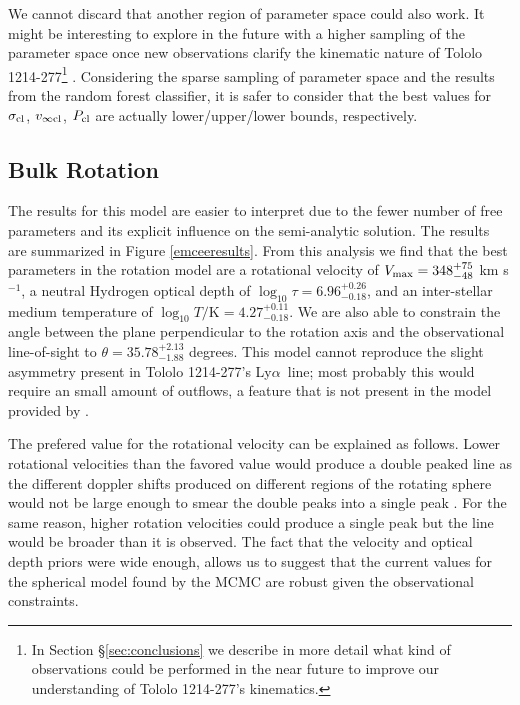 \documentclass[a4,useAMS,usenatbib,usegraphicx]{mn2e}
\newcommand{\tol}{Tololo 1214-277}
\newcommand{\lya}{Ly$\alpha$}
\newcommand{\kms}{km s$^{-1}$}
\begin{document}
We cannot discard that another region of parameter space
could also work.
It might be interesting to explore in the
future with a higher sampling of the parameter space once new 
observations  clarify the kinematic nature of \tol \footnote{In
  Section \S \ref{sec:conclusions} we describe  in more detail what
  kind of observations could be performed in the near future to
  improve our understanding of \tol's kinematics.} . 
Considering the sparse sampling of parameter space and the results
from the random forest classifier, it is safer to consider that
the best values for $\sigma_{\rm cl}$, $v_{\infty {\rm cl}}$, $P_{\rm
  cl}$ are actually lower/upper/lower bounds, respectively. 


\subsection{Bulk Rotation}

The results for this model are easier to interpret due to the fewer
number of free parameters and its explicit influence on the
semi-analytic solution.
The results are summarized in  Figure \ref{emceeresults}. 
From this analysis we find that the best parameters in the rotation
model are a rotational velocity of  $V_{\rm max}=348^{+75}_{-48}$
\kms, a neutral Hydrogen optical depth of
$\log_{10}\tau=6.96^{+0.26}_{-0.18}$,  and an inter-stellar medium
temperature of $\log_{10} T/\mathrm {K} = 4.27^{+0.11}_{-0.18}$.   
We are also able to constrain the angle between the plane
perpendicular to the rotation axis and the observational line-of-sight
to $\theta = 35.78^{+2.13}_{-1.88}$ degrees.
This model cannot reproduce the slight asymmetry present in \tol's
\lya\ line; most probably this would require an small amount of
outflows, a feature that is not present in the model provided by
\cite{GaravitoCamargo2014}. 

The prefered value for the rotational velocity can be explained as
follows. 
Lower rotational velocities than the favored value would produce a
double peaked line as the different doppler shifts produced on
different regions of the rotating sphere would not be large enough to
smear the double peaks into a single peak
\citep{GaravitoCamargo2014}. 
For the same reason, higher rotation velocities could produce a single
peak but the line would be broader than it is observed.
The fact that the velocity and optical depth priors were wide enough,
allows us to suggest that the current values for the spherical model
found by the MCMC are robust given the observational constraints.
\end{document}
